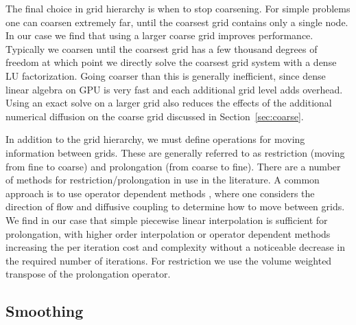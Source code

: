 \documentclass[11pt]{article}
\begin{document}
The final choice in grid hierarchy is when to stop coarsening. For simple
problems one can coarsen extremely far, until the coarsest grid contains only a
single node. In our case we find that using a larger coarse grid improves
performance. Typically we coarsen until the coarsest grid has a few thousand
degrees of freedom at which point we directly solve the coarsest grid system
with a dense LU factorization. Going coarser than this is generally inefficient,
since dense linear algebra on GPU is very fast and each additional grid level
adds overhead. Using an exact solve on a larger grid also reduces the
effects of the additional numerical diffusion on the coarse grid discussed in
Section~\ref{sec:coarse}.

In addition to the grid hierarchy, we must define operations for moving
information between grids. These are generally referred to as restriction
(moving from fine to coarse) and prolongation (from coarse to fine). There are a
number of methods for restriction/prolongation in use in the literature. A
common approach is to use operator dependent methods
\cite{de_zeeuw_matrix-dependent_1990}, where one
considers the direction of flow and diffusive coupling to determine how to move
between grids. We find in our case that simple piecewise
linear interpolation is sufficient for prolongation, with higher order interpolation or operator
dependent methods increasing the per iteration cost and complexity without a
noticeable decrease in the required number of iterations. For restriction we use
the volume weighted transpose of the prolongation operator.

\subsection{Smoothing}
\label{sec:smoothing}
\end{document}
